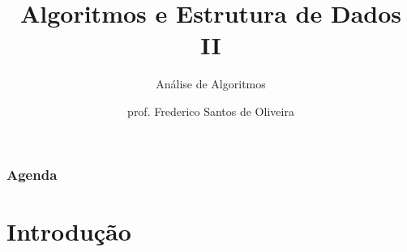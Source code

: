 \documentclass[aspectratio=169]{beamer}
\title[Análise de Algoritmos]{Algoritmos e Estrutura de Dados II}
\subtitle{Análise de Algoritmos}
\author[Frederico Santos de Oliveira]{prof. Frederico Santos de Oliveira}
\institute[UFMT]{Universidade Federal de Mato Grosso\\ Instituto de Engenharia}
\date{}
\begin{document}
\begin{frame}[plain]
  \titlepage
\end{frame}


\begin{frame}
  \frametitle{Agenda}
  \tableofcontents
\end{frame}

\section{Introdução}
\end{document}
